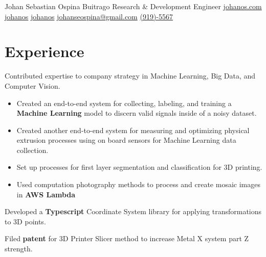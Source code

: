 \documentclass[]{plushcv}
\begin{document}
%
%
    
\namesection
{Johan Sebastian }
{Ospina Buitrago}
{Research \& Development Engineer}
{
    \contactline
    {\href{https://www.johanos.com}{johanos.com}}
    {\href{https://www.github.com/johanos}{johanos}}
    {\href{https://www.linkedin.com/in/johanos}
        {johanos}}
    {\href{mailto:johanseospina@gmail.com}{johanseospina@gmail.com}}
    {\href{tel:+1 (919) 946-5567}{(919)-5567}}
}

%
%

\begin{minipage}[t]{0.70\textwidth}



    \section{Experience}
    \vspace{\topsep} %
    \begin{tightemize}
        \sectionsep
        \item Contributed expertise to company strategy in Machine Learning, Big Data, and Computer Vision.
        \begin{itemize}
            \item Created an end-to-end system for collecting, labeling, and training
                  a \textbf{Machine Learning} model to discern valid signals inside of a noisy dataset.
            \item Created another end-to-end system for measuring and optimizing physical extrusion processes using on board sensors for Machine Learning data collection.
            \item Set up processes for first layer segmentation and classification for 3D printing.
            \item Used computation photography methods to process and create mosaic images in \textbf{AWS Lambda} 
        \end{itemize}
        \item Developed a \textbf{Typescript} Coordinate System library for applying transformations to 3D points.
        \item Filed \textbf{patent} for 3D Printer Slicer method to increase Metal X system part Z strength.
    \end{tightemize}
    \sectionsep


\end{minipage}
\end{document}
